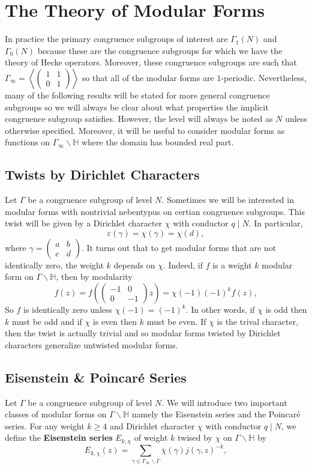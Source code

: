 \documentclass[12pt]{book}
\theoremstyle{definition}\newframedtheorem{method}{Method}
\renewcommand{\H}{\mathbb{H}}
\newcommand{\g}{\gamma}
\newcommand{\G}{\Gamma}
\newcommand{\e}{\varepsilon}
\newcommand{\<}{\langle}
\renewcommand{\>}{\rangle}
\newcommand{\conj}{\overline}
\newcommand{\cchi}{\conj{\chi}}
\newcommand{\GH}{\G\backslash\H}
\newcommand{\GG}{\G_{\infty}\backslash\G}
\begin{document}
  \section{The Theory of Modular Forms}
    In practice the primary congruence subgroups of interest are $\G_{1}(N)$ and $\G_{0}(N)$ because these are the congruence subgroups for which we have the theory of Hecke operators. Moreover, these congruence subgroups are such that $\G_{\infty} = \left\<\begin{pmatrix} 1 & 1 \\ 0 & 1 \end{pmatrix}\right\>$ so that all of the modular forms are $1$-periodic. Nevertheless, many of the following results will be stated for more general congruence subgroups so we will always be clear about what properties the implicit congruence subgroup satisfies. However, the level will always be noted as $N$ unless otherwise specified. Moreover, it will be useful to consider modular forms as functions on $\G_{\infty}\backslash\H$ where the domain has bounded real part.
    \subsection*{Twists by Dirichlet Characters}
      Let $\G$ be a congruence subgroup of level $N$. Sometimes we will be interested in modular forms with nontrivial nebentypus on certian congruence subgroups. This twist will be given by a Dirichlet character $\chi$ with conductor $q \mid N$. In particular,
      \[
        \e(\g) = \chi(\g) = \chi(d),
      \]
      where $\g = \begin{pmatrix} a & b \\ c & d \end{pmatrix}$. It turns out that to get modular forms that are not identically zero, the weight $k$ depends on $\chi$. Indeed, if $f$ is a weight $k$ modular form on $\GH$, then by modularity
      \[
        f(z) = f\left(\begin{pmatrix} -1 & 0 \\ 0 & -1 \end{pmatrix}z\right) = \chi(-1)(-1)^{k}f(z),
      \]
      So $f$ is identically zero unless $\chi(-1) = (-1)^{k}$. In other words, if $\chi$ is odd then $k$ must be odd and if $\chi$ is even then $k$ must be even. If $\chi$ is the trival character, then the twist is actually trivial and so modular forms twisted by Dirichlet characters generalize untwisted modular forms.
    \subsection*{Eisenstein \& Poincar\'e Series}
      Let $\G$ be a congruence subgroup of level $N$. We will introduce two important classes of modular forms on $\GH$ namely the Eisenstein series and the Poincar\'e series. For any weight $k \ge 4$ and Dirichlet character $\chi$ with conductor $q \mid N$, we define the \textbf{Eisenstein series} $E_{k,\chi}$ of weight $k$ twised by $\chi$ on $\GH$ by
      \[
        E_{k,\chi}(z) = \sum_{\g \in \GG}\cchi(\g)j(\g,z)^{-k},
      \]
\end{document}
